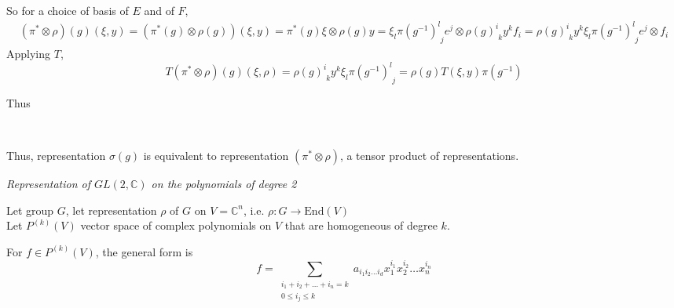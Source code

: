 \documentclass[10pt]{amsart}
\newcommand{\exercisehead}[1]
  { \smallskip
   \noindent{\small\bf Exercise #1.}
  }
\begin{document}
\begin{multicols*}{2}
\begin{enumerate}
	So for a choice of basis of $E$ and of $F$, 
	\[
	\begin{gathered}
	(\pi^*\otimes \rho)(g)(\xi,y) = (\pi^*(g)\otimes \rho(g))(\xi,y) = \pi^*(g)\xi \otimes \rho(g)y = \xi_l \pi(g^{-1})^l_{\,\,j} e^j \otimes \rho(g)^i_{\,\,k}y^k f_i = \rho(g)^i_{\,\,k}y^k \xi_l \pi(g^{-1})^l_{\,\,j} e^j \otimes f_i
	\end{gathered}
	\]
	Applying $T$,
	\[
	T(\pi^*\otimes \rho)(g)(\xi,\rho) = \rho(g)^i_{\,\,k} y^k \xi_l \pi(g^{-1})^l_{\,\,j} = \rho(g)T(\xi,y) \pi(g^{-1})
	\]
	
	Thus 
	 \quad \quad \quad \, 
	Thus, representation $\sigma(g)$ is equivalent to representation $(\pi^*\otimes \rho)$, a tensor product of representations.  
	
\end{enumerate}

\exercisehead{2.15} \emph{Representation of $GL(2, \mathbb{C})$ on the polynomials of degree 2}

Let group $G$, let representation $\rho$ of $G$ on $V= \mathbb{C}^n$, i.e. $\rho : G \to \text{End}(V)$ \\
Let $P^{(k)}(V)$ vector space of complex polynomials on $V$ that are homogeneous of degree $k$. 

For $f\in P^{(k)}(V)$, the general form is 
\[
f = \sum_{ \substack{ i_1 + i_2 + \dots + i_n = k \\ 0 \leq i_j \leq k } } a_{i_1 i_2 \dots i_d} x_1^{i_1} x_2^{i_2} \dots x_n^{i_n}
\]


\end{multicols*}
\end{document}
